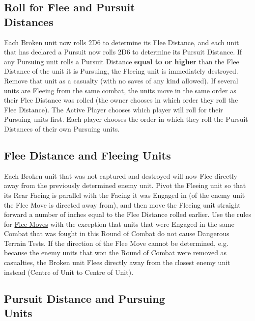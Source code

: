 \subsection[Roll for Flee and Pursuit Distances]{Roll for Flee and Pursuit\\ Distances}

Each Broken unit now rolls 2D6 to determine its Flee Distance, and each unit that has declared a Pursuit now rolls 2D6 to determine its Pursuit Distance. If any Pursuing unit rolls a Pursuit Distance \textbf{equal to or higher} than the Flee Distance of the unit it is Pursuing, the Fleeing unit is immediately destroyed. Remove that unit as a casualty (with no saves of any kind allowed). If several units are Fleeing from the same combat, the units move in the same order as their Flee Distance was rolled (the owner chooses in which order they roll the Flee Distance). The Active Player chooses which player will roll for their Pursuing units first. Each player chooses the order in which they roll the Pursuit Distances of their own Pursuing units.

\subsection{Flee Distance and Fleeing Units}

Each Broken unit that was not captured and destroyed will now Flee directly away from the previously determined enemy unit. Pivot the Fleeing unit so that its Rear Facing is parallel with the Facing it was Engaged in (of the enemy unit the Flee Move is directed away from), and then move the Fleeing unit straight forward a number of inches equal to the Flee Distance rolled earlier. Use the rules for \hyperref[flee_moves]{Flee Moves} with the exception that units that were Engaged in the same Combat that was fought in this Round of Combat do not cause Dangerous Terrain Tests.
If the direction of the Flee Move cannot be determined, e.g. because the enemy units that won the Round of Combat were removed as casualties, the Broken unit Flees directly away from the closest enemy unit instead (Centre of Unit to Centre of Unit).

\subsection[Pursuit Distance and Pursuing Units]{Pursuit Distance and Pursuing\\ Units}
\label{pursuit_distance_and_pursuing_units}


